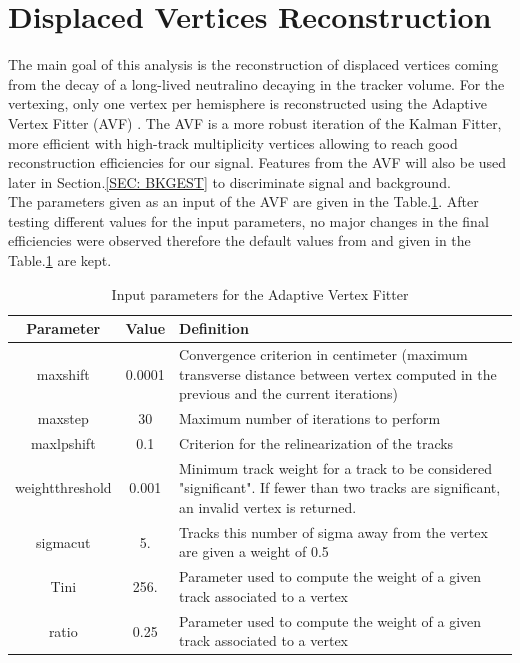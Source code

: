 \documentclass{cernatlasnote}
\begin{document}
\section{Displaced Vertices Reconstruction}
\label{SEC: DISVTX}

The main goal of this analysis is the reconstruction of displaced vertices coming from the decay of a long-lived neutralino decaying in the tracker volume. For the vertexing, only one vertex per hemisphere is reconstructed using the Adaptive Vertex Fitter (AVF) \cite{AVF}. The AVF is a more robust iteration of the Kalman Fitter, more efficient with high-track multiplicity vertices allowing to reach good reconstruction efficiencies for our signal. Features from the AVF will also be used later in Section.\ref{SEC: BKGEST} to discriminate signal and background.\\

The parameters given as an input of the AVF are given in the Table.\ref{tab:AVFPARAMETERS}. After testing different values for the input parameters, no major changes in the final efficiencies were observed therefore the default values from \cite{AVF} and given in the Table.\ref{tab:AVFPARAMETERS} are kept.\\

\begin{table}[h]
\centering
\begin{tabular}{|c|c|m{10 cm}|}
  \hline
  \rowcolor{lightgray} 
  Parameter & Value & Definition\\
  \hline
        maxshift & 0.0001 & Convergence criterion in centimeter (maximum transverse distance between vertex computed in the previous and the current iterations)\\
        \hline
        maxstep & 30 & Maximum number of iterations to perform\\
        \hline
        maxlpshift & 0.1 & Criterion for the relinearization of the tracks \\
        \hline
        weightthreshold & 0.001 & Minimum track weight for a track to be considered "significant". If fewer than two tracks are significant, an invalid vertex is returned.\\
        \hline
        sigmacut & 5. & Tracks this number of sigma away from the vertex are given a weight of 0.5\\
        \hline
        Tini & 256. & Parameter used to compute the weight of a given track associated to a vertex\\
        \hline
        ratio & 0.25 &  Parameter used to compute the weight of a given track associated to a vertex\\
  \hline
\end{tabular}
    \caption{Input parameters for the Adaptive Vertex Fitter}
    \label{tab:AVFPARAMETERS}
\end{table}
\end{document}
